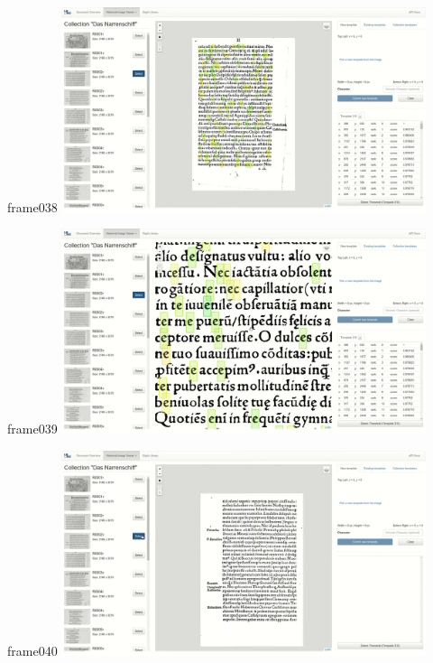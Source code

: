 \documentclass{beamer}
\begin{document}
\begin{frame}{frame038}
\includegraphics[width=0.8\textwidth]{output/exported-frames/frame038.png}
\note{}
\end{frame}

\begin{frame}{frame039}
\includegraphics[width=0.8\textwidth]{output/exported-frames/frame039.png}
\note{}
\end{frame}

\begin{frame}{frame040}
\includegraphics[width=0.8\textwidth]{output/exported-frames/frame040.png}
\note{}
\end{frame}
\end{document}
